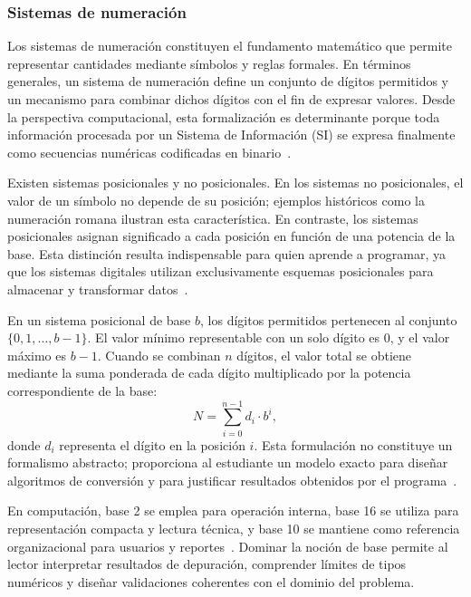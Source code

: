 \documentclass[12pt,twoside]{book}
\begin{document}
					\subsubsection{Sistemas de numeración}
						\noindent
						Los sistemas de numeración constituyen el fundamento matemático que permite representar cantidades mediante símbolos y reglas formales. En términos generales, un sistema de numeración define un conjunto de dígitos permitidos y un mecanismo para combinar dichos dígitos con el fin de expresar valores. Desde la perspectiva computacional, esta formalización es determinante porque toda información procesada por un Sistema de Información (SI) se expresa finalmente como secuencias numéricas codificadas en binario~\cite{Tanenbaum2021Structured,Manzano2017Programacion,Wirth1976Algorithms}.
						
						Existen sistemas posicionales y no posicionales. En los sistemas no posicionales, el valor de un símbolo no depende de su posición; ejemplos históricos como la numeración romana ilustran esta característica. En contraste, los sistemas posicionales asignan significado a cada posición en función de una potencia de la base. Esta distinción resulta indispensable para quien aprende a programar, ya que los sistemas digitales utilizan exclusivamente esquemas posicionales para almacenar y transformar datos~\cite{Tanenbaum2021Structured,Gaddis2022Starting,Hanly2015Problem}.
						
						En un sistema posicional de base $b$, los dígitos permitidos pertenecen al conjunto $\{0,1,\dots,b-1\}$. El valor mínimo representable con un solo dígito es $0$, y el valor máximo es $b-1$. Cuando se combinan $n$ dígitos, el valor total se obtiene mediante la suma ponderada de cada dígito multiplicado por la potencia correspondiente de la base:
						\[
						N = \sum_{i=0}^{n-1} d_i \cdot b^i,
						\]
						donde $d_i$ representa el dígito en la posición $i$. Esta formulación no constituye un formalismo abstracto; proporciona al estudiante un modelo exacto para diseñar algoritmos de conversión y para justificar resultados obtenidos por el programa~\cite{Wirth1976Algorithms,Hanly2015Problem,Manzano2017Programacion}.
						
						En computación, base 2 se emplea para operación interna, base 16 se utiliza para representación compacta y lectura técnica, y base 10 se mantiene como referencia organizacional para usuarios y reportes~\cite{Tanenbaum2021Structured,Laudon2020Management,Gaddis2022Starting}. Dominar la noción de base permite al lector interpretar resultados de depuración, comprender límites de tipos numéricos y diseñar validaciones coherentes con el dominio del problema.
						
\end{document}
